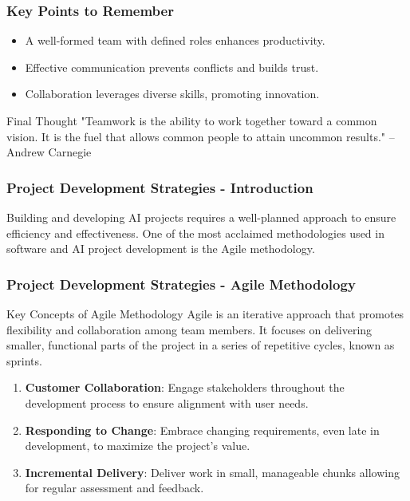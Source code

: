 \documentclass{beamer}
\begin{document}
\begin{frame}[fragile]
    \frametitle{Key Points to Remember}
    \begin{itemize}
        \item A well-formed team with defined roles enhances productivity.
        \item Effective communication prevents conflicts and builds trust.
        \item Collaboration leverages diverse skills, promoting innovation.
    \end{itemize}
    \begin{block}{Final Thought}
        "Teamwork is the ability to work together toward a common vision. It is the fuel that allows common people to attain uncommon results." – Andrew Carnegie
    \end{block}
\end{frame}

\begin{frame}[fragile]
    \frametitle{Project Development Strategies - Introduction}
    Building and developing AI projects requires a well-planned approach to ensure efficiency and effectiveness. One of the most acclaimed methodologies used in software and AI project development is the Agile methodology.
\end{frame}

\begin{frame}[fragile]
    \frametitle{Project Development Strategies - Agile Methodology}
    \begin{block}{Key Concepts of Agile Methodology}
        Agile is an iterative approach that promotes flexibility and collaboration among team members. It focuses on delivering smaller, functional parts of the project in a series of repetitive cycles, known as sprints.
    \end{block}
    
    \begin{enumerate}
        \item \textbf{Customer Collaboration}: Engage stakeholders throughout the development process to ensure alignment with user needs.
        \item \textbf{Responding to Change}: Embrace changing requirements, even late in development, to maximize the project's value.
        \item \textbf{Incremental Delivery}: Deliver work in small, manageable chunks allowing for regular assessment and feedback.
    \end{enumerate}
\end{frame}
\end{document}
